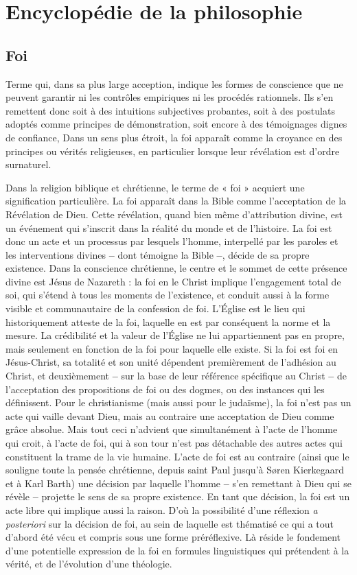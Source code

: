 
\section{Encyclopédie de la philosophie}
\subsection{Foi}
Terme qui, dans sa plus large acception,
indique les formes de conscience que
ne peuvent garantir ni les contrôles empiriques
ni les procédés rationnels. Ils s’en
remettent donc soit à des intuitions subjectives
probantes, soit à des postulats
adoptés comme principes de démonstration,
soit encore à des témoignages dignes
de confiance, Dans un sens plus étroit, la
foi apparaît comme la croyance en des
principes ou vérités religieuses, en particulier
lorsque leur révélation est d’ordre
surnaturel.

Dans la religion biblique et chrétienne,
le terme de « foi » acquiert une signification
particulière. La foi apparaît dans la
Bible comme l’acceptation de la Révélation
de Dieu. Cette révélation, quand
bien même d'attribution divine, est un
événement qui s'inscrit dans la réalité du
monde et de l’histoire. La foi est donc un
acte et un processus par lesquels
l’homme, interpellé par les paroles et les
interventions divines {\bf --} dont témoigne la
Bible {\bf --}, décide de sa propre existence.
Dans la conscience chrétienne, le centre
et le sommet de cette présence divine est
Jésus de Nazareth : la foi en le Christ
implique l’engagement total de soi, qui
s'étend à tous les moments de l’existence,
et conduit aussi à la forme visible et
communautaire de la confession de foi.
L'Église est le lieu qui historiquement
atteste de la foi, laquelle en est par conséquent
la norme et la mesure. La crédibilité
et la valeur de l'Église ne lui
appartiennent pas en propre, mais seulement
en fonction de la foi pour laquelle
elle existe. Si la foi est foi en Jésus-Christ,
sa totalité et son unité dépendent premièrement
de l’adhésion au Christ, et deuxièmement {\bf --}
sur la base de leur référence
spécifique au Christ {\bf --} de l’acceptation des
propositions de foi ou des dogmes, ou des
instances qui les définissent. Pour le christianisme
(mais aussi pour le judaïsme), la
foi n’est pas un acte qui vaille devant
Dieu, mais au contraire une acceptation
de Dieu comme grâce absolue. Mais tout
ceci n’advient que simultanément à l’acte
de l’homme qui croit, à l’acte de foi, qui
à son tour n’est pas détachable des autres
actes qui constituent la trame de la vie
humaine. L’acte de foi est au contraire
(ainsi que le souligne toute la pensée
chrétienne, depuis saint Paul jusqu’à
Søren Kierkegaard et à Karl Barth) une
décision par laquelle l’homme {\bf --} s’en
remettant à Dieu qui se révèle {\bf --} projette
le sens de sa propre existence. En tant
que décision, la foi est un acte libre qui
implique aussi la raison. D’où la possibilité
d’une réflexion {\it a posteriori} sur la décision
de foi, au sein de laquelle est
thématisé ce qui a tout d’abord été vécu
et compris sous une forme préréflexive.
Là réside le fondement d’une potentielle
expression de la foi en formules linguistiques
qui prétendent à la vérité, et de
l’évolution d’une théologie.

